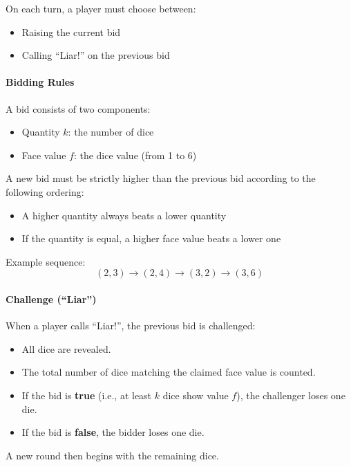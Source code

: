 \documentclass{article}
\begin{document}
On each turn, a player must choose between:
\begin{itemize}
    \item[(A)] Raising the current bid
    \item[(B)] Calling ``Liar!'' on the previous bid
\end{itemize}

\paragraph{Bidding Rules}

A bid consists of two components:
\begin{itemize}
    \item Quantity $k$: the number of dice
    \item Face value $f$: the dice value (from 1 to 6)
\end{itemize}

A new bid must be strictly higher than the previous bid according to the following ordering:
\begin{itemize}
    \item A higher quantity always beats a lower quantity
    \item If the quantity is equal, a higher face value beats a lower one
\end{itemize}

\noindent Example sequence:
\[
(2,3) \rightarrow (2,4) \rightarrow (3,2) \rightarrow (3,6)
\]

\paragraph{Challenge (``Liar'')}

When a player calls ``Liar!'', the previous bid is challenged:
\begin{itemize}
    \item All dice are revealed.
    \item The total number of dice matching the claimed face value is counted.
\end{itemize}

\begin{itemize}
    \item If the bid is \textbf{true} (i.e., at least $k$ dice show value $f$), the challenger loses one die.
    \item If the bid is \textbf{false}, the bidder loses one die.
\end{itemize}

A new round then begins with the remaining dice.
\end{document}
